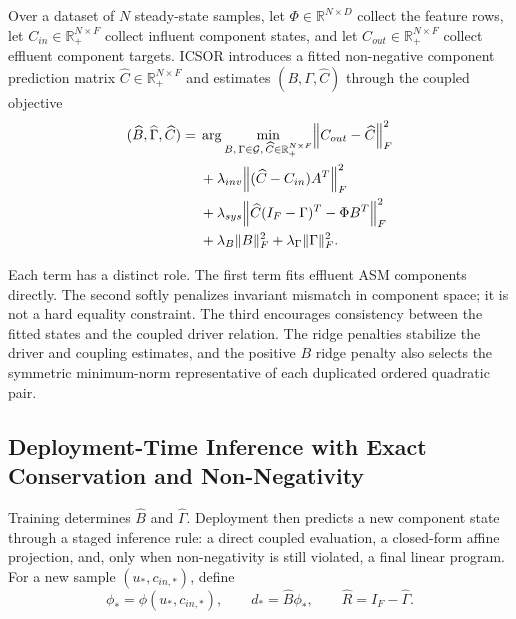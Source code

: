 \documentclass[a4paper,fleqn]{cas-sc}
\newenvironment{currentrevblock}{\begingroup\color{currentRevisionBlue}}{\endgroup}
\newenvironment{currentrevblock}{}{}
\newenvironment{revblock}{}{}
\begin{document}
\begin{revblock}
Over a dataset of $N$ steady-state samples, let $\Phi \in \mathbb{R}^{N \times D}$ collect the feature rows, let $C_{in} \in \mathbb{R}_{+}^{N \times F}$ collect influent component states, and let $C_{out} \in \mathbb{R}_{+}^{N \times F}$ collect effluent component targets. ICSOR introduces a fitted non-negative component prediction matrix $\widehat{C} \in \mathbb{R}_{+}^{N \times F}$ and estimates $(B, \Gamma, \widehat{C})$ through the coupled objective
\begin{equation}
\label{eq:training-objective}
\begin{aligned}
(\widehat{B}, \widehat{\Gamma}, \widehat{C}) = {}&
\arg\min_{B,\, \Gamma \in \mathcal{G},\, \widehat{C} \in \mathbb{R}_{+}^{N \times F}}
\Bigl\|
C_{out} - \widehat{C}
\Bigr\|_F^2 \\
&+ \lambda_{inv}
\Bigl\|
(\widehat{C} - C_{in})A^T
\Bigr\|_F^2 \\
&+ \lambda_{sys}
\Bigl\|
\widehat{C}(I_F - \Gamma)^T - \Phi B^T
\Bigr\|_F^2 \\
&+ \lambda_B \|B\|_F^2
+ \lambda_\Gamma \|\Gamma\|_F^2.
\end{aligned}
\end{equation}

\begin{currentrevblock}
Each term has a distinct role. The first term fits effluent ASM components directly. The second softly penalizes invariant mismatch in component space; it is not a hard equality constraint. The third encourages consistency between the fitted states and the coupled driver relation. The ridge penalties stabilize the driver and coupling estimates, and the positive $B$ ridge penalty also selects the symmetric minimum-norm representative of each duplicated ordered quadratic pair.
\end{currentrevblock}

\subsection{Deployment-Time Inference with Exact Conservation and Non-Negativity}

Training determines $\widehat{B}$ and $\widehat{\Gamma}$. Deployment then predicts a new component state through a staged inference rule: a direct coupled evaluation, a closed-form affine projection, and, only when non-negativity is still violated, a final linear program. For a new sample $(u_*, c_{in,*})$, define
\begin{equation}
\label{eq:deployment-definitions}
\phi_* = \phi(u_*, c_{in,*}), \qquad d_* = \widehat{B}\phi_*, \qquad \widehat{R} = I_F - \widehat{\Gamma}.
\end{equation}


\end{revblock}
\end{document}
